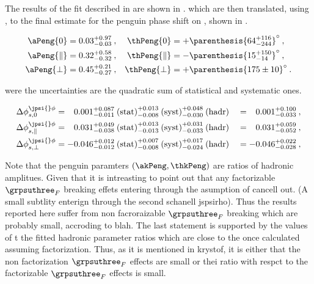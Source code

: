 The results of the \chisq fit described in  are shown in .
which are then translated, using , to the final estimate for the penguin phase shift on \phis,
shown in .

\begin{subequations}
\label{peng_a_theta_results}
\begin{align}
    \aPeng{0}         & = 0.03^{+0.97}_{-0.03}\:, & \thPeng{0}         & = +\parenthesis{64^{+116}_{-244}}^\circ\:,\\
    \aPeng{\parallel} & = 0.32^{+0.58}_{-0.32}\:, & \thPeng{\parallel} & = -\parenthesis{15^{+150}_{-14}}^\circ\:,\\
    \aPeng{\perp}     & = 0.45^{+0.21}_{-0.27}\:, & \thPeng{\perp}     & = +\parenthesis{175 \pm 10}^\circ\:.
\end{align}
\end{subequations}

\noindent were the uncertainties are the quadratic sum of statistical and systematic ones.

\begin{alignat}{2}
\Delta\phi^{\jpsi{}\phi}_{s,0} & =
\phantom{-}0.001^{+0.087}_{-0.011}\:\text{(stat)}^{+0.013}_{-0.008}\:\text{(syst)}^{+0.048}_{-0.030}\:(\text{hadr})
&& = \phantom{-}0.001^{+0.100}_{-0.033}\:,\\
%
\Delta\phi^{\jpsi{}\phi}_{s,\parallel} & =
\phantom{-}0.031^{+0.049}_{-0.038}\:\text{(stat)}^{+0.013}_{-0.013}\:\text{(syst)}^{+0.031}_{-0.033}\:(\text{hadr})
&& = \phantom{-}0.031^{+0.059}_{-0.052}\:,\\
%
\Delta\phi^{\jpsi{}\phi}_{s,\perp} & =
-0.046^{+0.012}_{-0.012}\:\text{(stat)}^{+0.007}_{-0.008}\:\text{(syst)}^{+0.017}_{-0.024}\:(\text{hadr})
&& = -0.046^{+0.022}_{-0.028}\:,
\label{delta_phis_result}
\end{alignat}

Note that the penguin paramters $(\akPeng,\thkPeng)$ are ratios of hadronic amplitues. Given that it is
intreasting to point out that any factorizable $\grpsuthree_F$ breaking effets entering through the asumption
of \equref{} cancell out. (A small subtlity enterign through the second schanell jspsirho).
Thus the results reported here suffer from non facroraizable $\grpsuthree_F$ breaking which are probably
small, accroding to blah. The last statement is supported by the values of t the fitted hadronic parameter
ratios which are close to the once calculated assuming factorization. Thus, as it is mentioned in krystof,
it is either that the non factorization $\grpsuthree_F$ effects are small or thei ratio with respct to
the factorizable $\grpsuthree_F$ effects is small.

